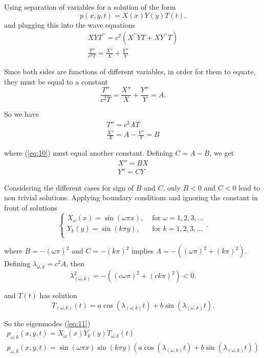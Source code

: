 Using separation of variables for a solution of the form
\[
  p(x,y,t) = X(x)Y(y)T(t)
.\] 
and plugging this into the wave equations
\begin{gather*}
  XYT^{\prime\prime} = c^2 \left(X^{\prime\prime}YT
  + XY^{\prime\prime}T\right) \\
  \frac{T''}{c^2T} = \frac{X''}{X} + \frac{Y''}{Y}
\end{gather*}

Since both sides are functions of different variables, in order for them to
equate, they must be equal to a constant
\[
  \frac{T''}{c^2T} = \frac{X''}{X} + \frac{Y''}{Y} = A
.\] 

So we have
\begin{gather}
  T'' = c^2AT \nonumber \\
  \frac{X''}{X} = A - \frac{Y''}{Y} = B \label{eq:10}
\end{gather}

where (\ref{eq:10}) must equal another constant. Defining $C = A-B$, we get
\begin{gather*}
  X'' = BX \\
  Y'' = CY
\end{gather*}

Considering the different cases for sign of $B$ and  $C$, only $B < 0$ and $C
<0$ lead to non trivial solutions. Applying boundary conditions and
ignoring the constant in front of solutions
\[
\begin{cases}
  X_{ \omega }(x) = \sin (\omega \pi x), &\text{ for } \omega = 1,2,3,\dots \\
  Y_{k}(y) = \sin (k\pi y), &\text{ for } k = 1,2,3,\dots \\
\end{cases}
.\] 

where $B = - (\omega \pi)^2$ and $C = - (k \pi )^2$ implies $ A = - ( (\omega
\pi )^2 + (k \pi )^2)$. Defining $ \lambda_{\omega ,k} = c^2A $, then
\[
  \lambda _{(\omega ,k)}^2 = - ( (c \omega \pi )^2 + (c k \pi )^2) < 0
.\] 

and $T(t)$ has solution
\[
  T_{(\omega ,k)}(t) = a\cos \left( \lambda _{(\omega ,k)}t \right) + b\sin
  \left(  \lambda _{(\omega ,k)} t\right)
.\] 

So the eigenmodes (\ref{eq:11})
\begin{gather}
  p_{\omega, k}(x,y,t) = X_{ \omega }(x)Y_{ k}(y)T_{ \omega,k }(t) \nonumber \\
   \boxed{p_{\omega, k}(x,y,t) = \sin (\omega \pi x)\sin (k \pi y) \left( a\cos
   \left( \lambda _{(\omega ,k)}t \right) + b\sin \left(  \lambda _{(\omega
   ,k)} t\right)\right)} \label{eq:11}
\end{gather}

